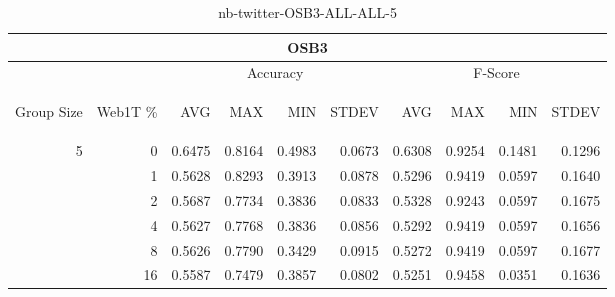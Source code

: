 \begin{center}
\begin{table}[htbp]
\begin{center}
\begin{tabular}{ | r | r | r | r | r | r | r | r | r | r |}
\hline
\multicolumn{10}{|c|}{OSB3}\\
\hline
 & & \multicolumn{4}{|c|}{Accuracy} & \multicolumn{4}{|c|}{F-Score}\\ \cline{3-10}
\begin{sideways}Group Size\end{sideways} & \begin{sideways}Web1T \%\end{sideways} & \begin{sideways}AVG\end{sideways} & \begin{sideways}MAX\end{sideways} & \begin{sideways}MIN\end{sideways} & \begin{sideways}STDEV\end{sideways} & \begin{sideways}AVG\end{sideways} & \begin{sideways}MAX\end{sideways} & \begin{sideways}MIN\end{sideways} & \begin{sideways}STDEV\end{sideways}\\
\hline
\multirow{5}{*}{5}
 & 0 & 0.6475 & 0.8164 & 0.4983 & 0.0673 & 0.6308 & 0.9254 & 0.1481 & 0.1296\\ \cline{2-10}
 & 1 & 0.5628 & 0.8293 & 0.3913 & 0.0878 & 0.5296 & 0.9419 & 0.0597 & 0.1640\\ \cline{2-10}
 & 2 & 0.5687 & 0.7734 & 0.3836 & 0.0833 & 0.5328 & 0.9243 & 0.0597 & 0.1675\\ \cline{2-10}
 & 4 & 0.5627 & 0.7768 & 0.3836 & 0.0856 & 0.5292 & 0.9419 & 0.0597 & 0.1656\\ \cline{2-10}
 & 8 & 0.5626 & 0.7790 & 0.3429 & 0.0915 & 0.5272 & 0.9419 & 0.0597 & 0.1677\\ \cline{2-10}
 & 16 & 0.5587 & 0.7479 & 0.3857 & 0.0802 & 0.5251 & 0.9458 & 0.0351 & 0.1636\\ \cline{2-10}
\hline
\end{tabular}
\caption{nb-twitter-OSB3-ALL-ALL-5}
\label{table:nb-twitter-OSB3-ALL-ALL-5}
\end{center}
\end{table}
\end{center}

